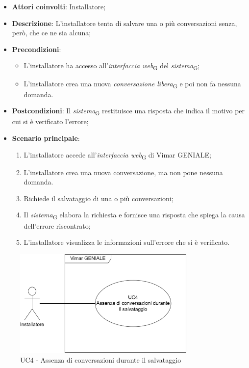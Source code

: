 \begin{itemize}
    \item \textbf{Attori coinvolti}: Installatore;
    \item \textbf{Descrizione}: L’installatore tenta di salvare una o più conversazioni senza, però, che ce ne sia alcuna;
    \item \textbf{Precondizioni}: 
        \begin{itemize}
            \item L’installatore ha accesso all’\textit{interfaccia web}\textsubscript{G} del \textit{sistema}\textsubscript{G};
            \item L'installatore crea una nuova \textit{conversazione libera}\textsubscript{G} e poi non fa nessuna domanda.
        \end{itemize}
    \item \textbf{Postcondizioni}: Il \textit{sistema}\textsubscript{G} restituisce una risposta che indica il motivo per cui si è verificato l’errore;
    \item \textbf{Scenario principale}:
    \begin{enumerate}
    \item L’installatore accede all’\textit{interfaccia web}\textsubscript{G} di Vimar GENIALE;
    \item L'installatore crea una nuova conversazione, ma non pone nessuna domanda.
    \item Richiede il salvataggio di una o più conversazioni;
    \item Il \textit{sistema}\textsubscript{G} elabora la richiesta e fornisce una risposta che spiega la causa dell'errore riscontrato;
    \item L’installatore visualizza le informazioni sull’errore che si è verificato.
    \end{enumerate}
\end{itemize}
\begin{figure}[H]
\centering
\includegraphics[width=0.8\textwidth]{contents/casi_duso/png/UC4.png}
\caption{UC4 - Assenza di conversazioni durante il salvataggio}
\end{figure}


